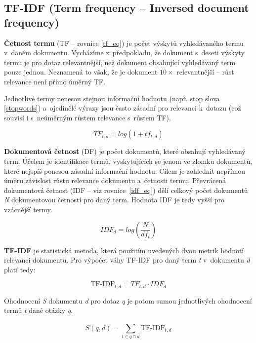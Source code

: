 \subsection{TF-IDF (Term frequency -- Inversed document frequency)}
\label{tf-idf}

\textbf{Četnost termu} (TF -- rovnice \ref{tf_eq}) je počet výskytů vyhledávaného termu v~daném dokumentu. Vycházíme z~předpokladu, že dokument s~deseti výskyty termu je pro dotaz relevantnější, než dokument obsahující vyhledávaný term pouze jednou. Neznamená to však, že je dokument $10\times$  relevantnější -- růst relevance není přímo úměrný TF.\par
Jednotlivé termy nenesou stejnou informační hodnotu (např. stop slova \ref{stopwords}) a~ojedinělé výrazy jsou často zásadní pro relevanci k~dotazu (což souvisí i s~neúměrným růstem relevance s~růstem TF).\par

\begin{equation}
\label{tf_eq}
    TF_{t,d} = log(1+tf_{t,d})
\end{equation}

\textbf{Dokumentová četnost} (DF) je počet dokumentů, které obsahují vyhledávaný term. Účelem je identifikace termů, vyskytujících se jenom ve zlomku dokumentů, které nejspíš ponesou zásadní informační hodnotu. Cílem je zohlednit nepřímou úměru závislost růstu relevance dokumentu a~četnosti termu. Převrácená dokumentová četnost  (IDF -- viz rovnice~\ref{idf_eq}) dělí celkový počet dokumentů \emph{N} dokumentovou četností pro daný term. Hodnota IDF je tedy vyšší pro vzácnější termy.\par

\begin{equation}
\label{idf_eq}
    IDF_{d} = log(\frac{N}{df_t})
\end{equation}

\textbf{TF-IDF} je statistická metoda, která použitím uvedených dvou metrik hodnotí relevanci dokumentu.
Pro výpočet váhy TF-IDF pro daný term \emph{t} v~dokumentu \emph{d} platí tedy:

\begin{equation}
    \text{TF-IDF}_{t,d} = TF_{t,d} \cdot IDF_d
\end{equation}

Ohodnocení \emph{S} dokumentu \emph{d} pro dotaz \emph{q} je potom sumou jednotlivých ohodnocení termů \emph{t} dané otázky \emph{q}.

\begin{equation}
    S(q,d) = \sum_{t\in{q \cap d}}^{}\text{TF-IDF}_{t,d}
\end{equation}

